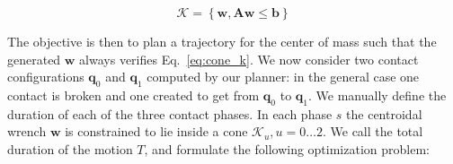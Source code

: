 \documentclass[journal]{IEEEtran}
\begin{document}
\begin{equation}
\label{eq:cone_k}
	\mathcal{K} =  \left\{ \mathbf{w}, \mathbf{A}\mathbf{w} \leq \mathbf{b	} \right\}
\end{equation}

The objective 
is then to plan a trajectory for the center of mass such that the generated $\mathbf{w}$ always verifies Eq.~\ref{eq:cone_k}. 
We now consider two contact configurations  $\mathbf{q}_0$ and $\mathbf{q}_1$ computed by our planner: in the general case one contact is broken and one created to get from
$\mathbf{q}_0$ to $\mathbf{q}_1$. We manually define the duration of each of the three contact phases.
In each phase $s$ the centroidal wrench $\mathbf{w}$ is constrained to lie inside a cone $\mathcal{K}_u, u =0 \dots 2$.
We call the total duration of the motion $T$, and formulate the following optimization problem:
\end{document}
